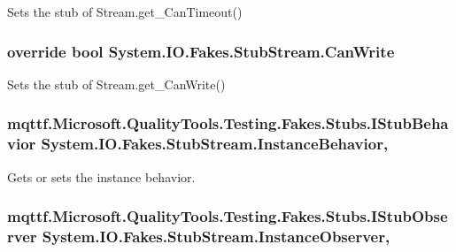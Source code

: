 Sets the stub of Stream.\-get\-\_\-\-Can\-Timeout()

\hypertarget{class_system_1_1_i_o_1_1_fakes_1_1_stub_stream_ad0f2985991a3229063b5ba1accd3eb16}{
\subsubsection[{Can\-Write}]{\setlength{\rightskip}{0pt plus 5cm}override bool System.\-I\-O.\-Fakes.\-Stub\-Stream.\-Can\-Write\hspace{0.3cm}{\ttfamily [get]}}}\label{class_system_1_1_i_o_1_1_fakes_1_1_stub_stream_ad0f2985991a3229063b5ba1accd3eb16}


Sets the stub of Stream.\-get\-\_\-\-Can\-Write()

\hypertarget{class_system_1_1_i_o_1_1_fakes_1_1_stub_stream_a27ecb806e7bcb4f08cac1bca568b1d37}{
\subsubsection[{Instance\-Behavior}]{\setlength{\rightskip}{0pt plus 5cm}mqttf.\-Microsoft.\-Quality\-Tools.\-Testing.\-Fakes.\-Stubs.\-I\-Stub\-Behavior System.\-I\-O.\-Fakes.\-Stub\-Stream.\-Instance\-Behavior\hspace{0.3cm}{\ttfamily [get]}, {\ttfamily [set]}}}\label{class_system_1_1_i_o_1_1_fakes_1_1_stub_stream_a27ecb806e7bcb4f08cac1bca568b1d37}


Gets or sets the instance behavior.

\hypertarget{class_system_1_1_i_o_1_1_fakes_1_1_stub_stream_a43a02650d9f929f517f09b272d4e0627}{
\subsubsection[{Instance\-Observer}]{\setlength{\rightskip}{0pt plus 5cm}mqttf.\-Microsoft.\-Quality\-Tools.\-Testing.\-Fakes.\-Stubs.\-I\-Stub\-Observer System.\-I\-O.\-Fakes.\-Stub\-Stream.\-Instance\-Observer\hspace{0.3cm}{\ttfamily [get]}, {\ttfamily [set]}}}\label{class_system_1_1_i_o_1_1_fakes_1_1_stub_stream_a43a02650d9f929f517f09b272d4e0627}


